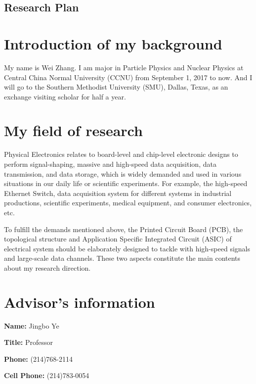 \documentclass[11pt,a4paper]{article}
\begin{document}
\begin{spacing}{1.2}           %

\begin{center}
\section*{\huge Research Plan}
\end{center}

\section*{Introduction of my background}    %
My name is Wei Zhang. I am major in Particle Physics and Nuclear Physics at Central China Normal University (CCNU) from September 1, 2017 to now. And I will go to the Southern Methodist University (SMU), Dallas, Texas, as an exchange visiting scholar for half a year.
\section*{My field of research}    %
Physical Electronics relates to board-level and chip-level electronic designs to perform signal-shaping, massive and high-speed data acquisition, data transmission, and data storage, which is widely demanded and used in various situations in our daily life or scientific experiments. For example, the high-speed Ethernet Switch, data acquisition system for different systems in industrial productions, scientific experiments, medical equipment, and consumer electronics, etc.

To fulfill the demands mentioned above, the Printed Circuit Board (PCB), the topological structure and Application Specific Integrated Circuit (ASIC) of electrical system should be elaborately designed to tackle with high-speed signals and large-scale data channels. These two aspects constitute the main contents about my research direction.

\section*{Advisor's information}     %
\begin{multicols}{2}
\textbf{Name:} Jingbo Ye   

\textbf{Title:} Professor 

\textbf{Phone:} (214)768-2114

\textbf{Cell Phone:} (214)783-0054


\end{multicols}
\end{spacing}
\end{document}
